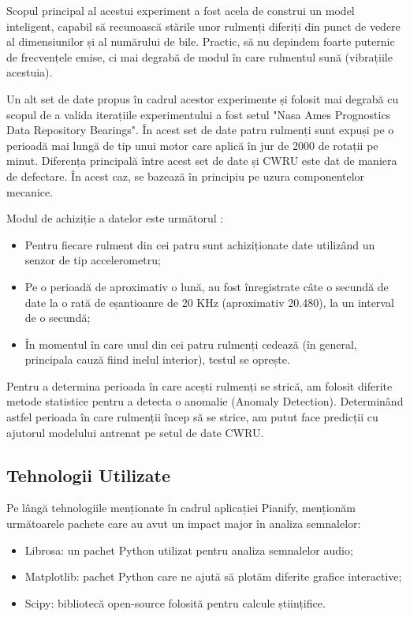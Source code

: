 \documentclass[a4paper,12pt]{report}
\begin{document}
    	Scopul principal al acestui experiment a fost acela de construi un model inteligent, capabil să recunoască stările unor rulmenți diferiți din punct de vedere al dimensiunilor și al numărului de bile. Practic, să nu depindem foarte puternic de frecvențele emise, ci mai degrabă de modul în care rulmentul sună (vibrațiile acestuia).
    	
    	Un alt set de date propus în cadrul acestor experimente și folosit mai degrabă cu scopul de a valida iterațiile experimentului a fost setul "Nasa Ames Prognostics Data Repository Bearings". În acest set de date patru rulmenți sunt expuși pe o perioadă mai lungă de tip unui motor care aplică în jur de 2000 de rotații pe minut. Diferența principală între acest set de date și CWRU este dat de maniera de defectare. În acest caz, se bazează în principiu pe uzura componentelor mecanice. 
    	
    	Modul de achiziție a datelor este următorul :
    	
    	\begin{itemize}
    		\item Pentru fiecare rulment din cei patru sunt achiziționate date utilizând un senzor de tip accelerometru;
    		\item Pe o perioadă de aproximativ o lună, au fost înregistrate câte o secundă de date la o rată de eșantioanre de 20 KHz (aproximativ 20.480), la un interval de o secundă;
    		\item În momentul în care unul din cei patru rulmenți cedează (în general, principala cauză fiind inelul interior), testul se oprește.
    	\end{itemize}
    	
    	Pentru a determina perioada în care acești rulmenți se strică, am folosit diferite metode statistice pentru a detecta o anomalie (Anomaly Detection). Determinând astfel perioada în care rulmenții încep să se strice, am putut face predicții cu ajutorul modelului antrenat pe setul de date CWRU.
    	
    	\subsection{Tehnologii Utilizate}
    	
    	Pe lângă tehnologiile menționate în cadrul aplicației Pianify, menționăm următoarele pachete care au avut un impact major în analiza semnalelor:
    	
    	\begin{itemize}
    		\item Librosa: un pachet Python utilizat pentru analiza semnalelor audio;
    		\item Matplotlib: pachet Python care ne ajută să plotăm diferite grafice interactive;
    		\item Scipy: bibliotecă open-source folosită pentru calcule științifice.
    	\end{itemize}
    	\clearpage
\end{document}
